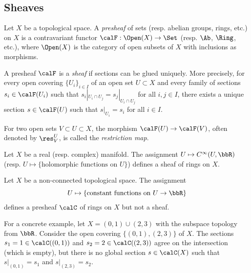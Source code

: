 \subsection{Sheaves}

    \begin{definition}\label{def:sheaves}
        Let \(X\) be a topological space.
        A \emph{presheaf} of sets (resp. abelian groups, rings, etc.) on \(X\) is a contravariant functor \(\calF : \Open(X) \to \Set\) (resp. \(\Ab\), \(\Ring\), etc.), 
        where \(\Open(X)\) is the category of open subsets of \(X\) with inclusions as morphisms.

        A presheaf \(\calF\) is a \emph{sheaf} if sections can be glued uniquely.
        More precisely, for every open covering \(\{U_i\}_{i \in I}\) of an open set \(U \subset X\) and every family of sections \(s_i \in \calF(U_i)\) such that \(s_i|_{U_i \cap U_j} = s_j|_{U_i \cap U_j}\) for all \(i,j \in I\),
        there exists a unique section \(s \in \calF(U)\) such that \(s|_{U_i} = s_i\) for all \(i \in I\).
    \end{definition}

    For two open sets \(V \subset U \subset X\), the morphism \(\calF(U) \to \calF(V)\), often denoted by \(\res^U_V\), is called the \emph{restriction map}.

    \begin{example}\label{eg:sheaf_of_smooth_and_analytic_functions}
        Let \(X\) be a real (resp. complex) manifold.
        The assignment \(U \mapsto C^\infty(U, \bbR)\) (resp. \(U \mapsto \{\text{holomorphic functions on }U\}\)) defines a sheaf of rings on \(X\).
    \end{example}

    \begin{example}\label{eg:presheaf_but_not_sheaf}
        Let \(X\) be a non-connected topological space.
        The assignment 
        \[U \mapsto \{\text{constant functions on }U \to \bbR\}\] 
        defines a presheaf \(\calC\) of rings on \(X\) but not a sheaf.

        For a concrete example, let \(X = (0,1)\cup (2,3)\) with the subspace topology from \(\bbR\).
        Consider the open covering \(\{(0,1), (2,3)\}\) of \(X\).
        The sections \(s_1 = 1 \in \calC((0,1))\) and \(s_2 = 2 \in \calC((2,3))\) agree on the intersection (which is empty), 
        but there is no global section \(s \in \calC(X)\) such that \(s|_{(0,1)} = s_1\) and \(s|_{(2,3)} = s_2\).
    \end{example}

